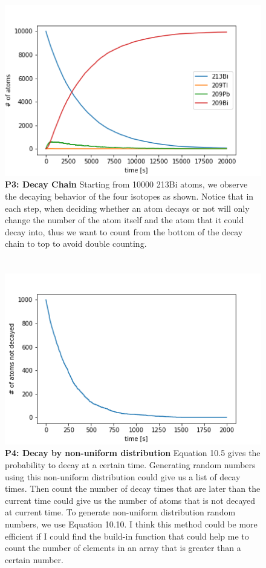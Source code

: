 \documentclass[11pt]{article}
\begin{document}
\section*{}

\begin{figure}
    \includegraphics{p3.png}
    \caption{\textbf{P3: Decay Chain}
    Starting from 10000 213Bi atoms, we observe the decaying behavior of the four isotopes as shown. Notice that in each step, when deciding whether an atom decays or not will only change the number of the atom itself and the atom that it could decay into, thus we want to count from the bottom of the decay chain to top to avoid double counting.}
    \label{fig}
\end{figure}

\section*{}

\begin{figure}
    \includegraphics{p4.png}
    \caption{\textbf{P4: Decay by non-uniform distribution}
    Equation 10.5 gives the probability to decay at a certain time. Generating random numbers using this non-uniform distribution could give us a list of decay times. Then count the number of decay times that are later than the current time could give us the number of atoms that is not decayed at current time. To generate non-uniform distribution random numbers, we use Equation 10.10. I think this method could be more efficient if I could find the build-in function that could help me to count the number of elements in an array that is greater than a certain number.}
    \label{fig}
\end{figure}
\end{document}
